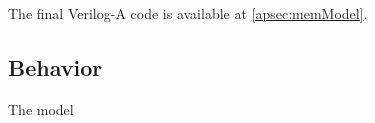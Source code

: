 The final Verilog-A code is available at \cref{apsec:memModel}.

\subsection{Behavior}

The model



